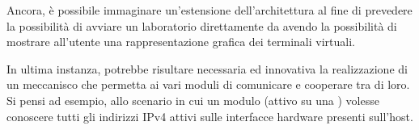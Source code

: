 Ancora, è possibile immaginare un'estensione dell'architettura al fine di prevedere la possibilità di avviare un laboratorio direttamente da \visualnetkit{} avendo la possibilità di mostrare all'utente una rappresentazione grafica dei terminali virtuali.

In ultima instanza, potrebbe risultare necessaria ed innovativa la realizzazione di un meccanisco che permetta ai vari moduli di comunicare e cooperare tra di loro. Si pensi ad esempio, allo scenario in cui un modulo (attivo su una \virtualmachine) volesse conoscere tutti gli indirizzi IPv4 attivi sulle interfacce hardware presenti sull'host.
